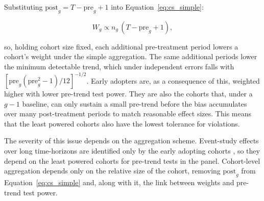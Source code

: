 \documentclass[12pt]{article}
\begin{document}
Substituting $\text{post}_g = T -\text{pre}_g + 1$ into Equation~\ref{eq:cs_simple}:

\begin{equation}\label{eq:diverge}
    W_g \propto n_g \, (T - \text{pre}_g + 1),
\end{equation}

so, holding cohort size fixed, each additional pre-treatment period lowers a cohort's weight under the simple aggregation. The same additional periods lower the minimum detectable trend, which under
independent errors falls with $[\text{pre}_g(\text{pre}_g^2 - 1)/12]^{-1/2}$. Early adopters are, as a consequence of this, weighted higher with lower pre-trend test power. They are also the cohorts that, under a $g-1$ baseline, can only sustain a small pre-trend before the bias accumulates over many post-treatment periods to match reasonable effect sizes. This means that the least powered cohorts also have the lowest tolerance for violations.

The severity of this issue depends on the aggregation scheme. Event-study effects over long time-horizons are identified only by the early adopting cohorts \parencite{liu2025cohort}, so they depend on the least powered cohorts for pre-trend tests in the panel. Cohort-level aggregation depends only on the relative size of the cohort, removing $\text{post}_g$ from Equation~\ref{eq:cs_simple} and, along with it, the link between weights and pre-trend test power.
\end{document}
